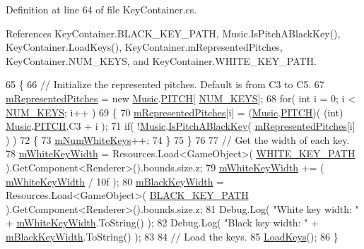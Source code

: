 Definition at line 64 of file Key\+Container.\+cs.



References Key\+Container.\+B\+L\+A\+C\+K\+\_\+\+K\+E\+Y\+\_\+\+P\+A\+TH, Music.\+Is\+Pitch\+A\+Black\+Key(), Key\+Container.\+Load\+Keys(), Key\+Container.\+m\+Represented\+Pitches, Key\+Container.\+N\+U\+M\+\_\+\+K\+E\+YS, and Key\+Container.\+W\+H\+I\+T\+E\+\_\+\+K\+E\+Y\+\_\+\+P\+A\+TH.


\begin{DoxyCode}
65     \{
66         \textcolor{comment}{// Initialize the represented pitches. Default is from C3 to C5.}
67         \hyperlink{group___key_contain_priv_var_ga103945a6efe3469191e5253d13fec5be}{mRepresentedPitches} = \textcolor{keyword}{new} \hyperlink{class_music}{Music}.\hyperlink{group___music_enums_ga508f69b199ea518f935486c990edac1d}{PITCH}[
      \hyperlink{group___key_contain_const_gaa8fe6473e6396976e52c5793f027380e}{NUM\_KEYS}];
68         \textcolor{keywordflow}{for}( \textcolor{keywordtype}{int} i = 0; i < \hyperlink{group___key_contain_const_gaa8fe6473e6396976e52c5793f027380e}{NUM\_KEYS}; i++ )
69         \{
70             \hyperlink{group___key_contain_priv_var_ga103945a6efe3469191e5253d13fec5be}{mRepresentedPitches}[i] = (\hyperlink{class_music}{Music}.\hyperlink{group___music_enums_ga508f69b199ea518f935486c990edac1d}{PITCH})( (\textcolor{keywordtype}{int})
      \hyperlink{class_music}{Music}.\hyperlink{group___music_enums_ga508f69b199ea518f935486c990edac1d}{PITCH}.C3 + i );
71             \textcolor{keywordflow}{if}( !\hyperlink{class_music}{Music}.\hyperlink{group___music_stat_func_gacc2c1a66df7197225f61c5737f794065}{IsPitchABlackKey}( 
      \hyperlink{group___key_contain_priv_var_ga103945a6efe3469191e5253d13fec5be}{mRepresentedPitches}[i] ) )
72             \{
73                 \hyperlink{group___key_contain_priv_var_ga7a5547a1fe5c40eac487fe6c826c8f9c}{mNumWhiteKeys}++;
74             \}
75         \}
76 
77         \textcolor{comment}{// Get the width of each key.}
78         \hyperlink{group___key_contain_priv_var_gae5b8787a5242834f99ad8072e7ea6004}{mWhiteKeyWidth} = Resources.Load<GameObject>( 
      \hyperlink{group___key_contain_const_ga8ce7e53d5c067095ee26b96fcc522584}{WHITE\_KEY\_PATH} ).GetComponent<Renderer>().bounds.size.z;
79         \hyperlink{group___key_contain_priv_var_gae5b8787a5242834f99ad8072e7ea6004}{mWhiteKeyWidth} += ( \hyperlink{group___key_contain_priv_var_gae5b8787a5242834f99ad8072e7ea6004}{mWhiteKeyWidth} / 10f );
80         \hyperlink{group___key_contain_priv_var_ga6461d765c3904e6a3031558d7385be25}{mBlackKeyWidth} = Resources.Load<GameObject>( 
      \hyperlink{group___key_contain_const_gac968b0d398c545a13abad255d8287825}{BLACK\_KEY\_PATH} ).GetComponent<Renderer>().bounds.size.z;
81         Debug.Log( \textcolor{stringliteral}{"White key width: "} + \hyperlink{group___key_contain_priv_var_gae5b8787a5242834f99ad8072e7ea6004}{mWhiteKeyWidth}.ToString() );
82         Debug.Log( \textcolor{stringliteral}{"Black key width: "} + \hyperlink{group___key_contain_priv_var_ga6461d765c3904e6a3031558d7385be25}{mBlackKeyWidth}.ToString() );
83 
84         \textcolor{comment}{// Load the keys.}
85         \hyperlink{group___key_contain_priv_func_ga65f79700f265d2223681ac95981ab4a3}{LoadKeys}();      
86     \}
\end{DoxyCode}
